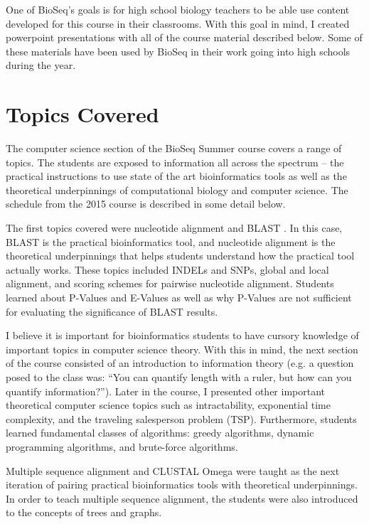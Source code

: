 \documentclass{report}
\begin{document}
One of BioSeq's goals is for high school biology teachers to be able use content developed for this course in their classrooms. With this goal in mind, I created powerpoint presentations with all of the course material described below. Some of these materials have been used by BioSeq in their work going into high schools during the year. 

\section{Topics Covered}
The computer science section of the BioSeq Summer course covers a range of topics. The students are exposed to information all across the spectrum -- the practical instructions to use state of the art bioinformatics tools as well as the theoretical underpinnings of computational biology and computer science. The schedule from the 2015 course is described in some detail below. 

The first topics covered were nucleotide alignment and BLAST  \cite{altschul1990basic}. In this case, BLAST is the practical bioinformatics tool, and nucleotide alignment is the theoretical underpinnings that helps students understand how the practical tool actually works. These topics included INDELs and SNPs, global and local alignment, and scoring schemes for pairwise nucleotide alignment. Students learned about P-Values and E-Values as well as why P-Values are not sufficient for evaluating the significance of BLAST results. 

I believe it is important for bioinformatics students to have cursory knowledge of important topics in computer science theory. With this in mind, the next section of the course consisted of an introduction to information theory (e.g. a question posed to the class was: ``You can quantify length with a ruler, but how can you quantify information?''). Later in the course, I presented other important theoretical computer science topics such as intractability, exponential time complexity, and the traveling salesperson problem (TSP). Furthermore, students learned fundamental classes of algorithms: greedy algorithms, dynamic programming algorithms, and brute-force algorithms. 

Multiple sequence alignment and CLUSTAL Omega \cite{sievers2011fast} were taught as the next iteration of pairing practical bioinformatics tools with theoretical underpinnings. In order to teach multiple sequence alignment, the students were also introduced to the concepts of trees and graphs.
\end{document}
